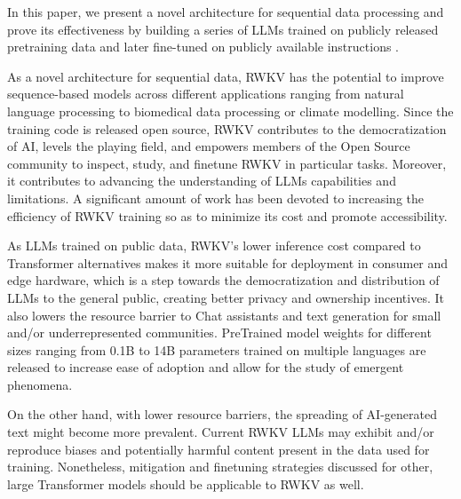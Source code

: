 \documentclass[11pt]{article}
\begin{document}
In this paper, we present a novel architecture for sequential data processing and prove its effectiveness by building a series of LLMs trained on publicly released pretraining data \cite{gao2020pile,biderman2022datasheet} and later fine-tuned on publicly available instructions \cite{alpaca, codealpaca, guanaco, gpt4all, sharegpt, Firefly, BELLE,belle2023exploring}.

As a novel architecture for sequential data, RWKV has the potential to improve sequence-based models across different applications ranging from natural language processing to biomedical data processing or climate modelling. Since the training code is released open source, RWKV contributes to the democratization of AI, levels the playing field, and empowers members of the Open Source community to inspect, study, and finetune RWKV in particular tasks. Moreover, it contributes to advancing the understanding of LLMs capabilities and limitations. A significant amount of work has been devoted to increasing the efficiency of RWKV training  so as to minimize its cost and promote accessibility.

As LLMs trained on public data, RWKV's lower inference cost compared to Transformer alternatives makes it more suitable for deployment in consumer and edge hardware, which is a step towards the democratization and distribution of LLMs to the general public, creating better privacy and ownership incentives. It also lowers the resource barrier to Chat assistants and text generation for small and/or underrepresented communities. PreTrained model weights for different sizes ranging from 0.1B to 14B parameters trained on multiple languages are released to increase ease of adoption and allow for the study of emergent phenomena. 

On the other hand, with lower resource barriers, the spreading of AI-generated text might become more prevalent. Current RWKV LLMs may exhibit and/or reproduce biases and potentially harmful content present in the data used for training. Nonetheless, mitigation and finetuning strategies discussed for other, large Transformer models should be applicable to RWKV as well. 


\end{document}
